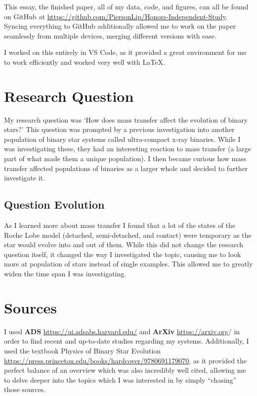 \documentclass[12pt, a4paper]{article}
\begin{document}
	This essay, the finished paper, all of my data, code, and figures, can all be found on GitHub at \url{https://github.com/PiersonLip/Honors-Independent-Study}. Syncing everything to GitHub additionally allowed me to work on the paper seamlessly from multiple devices, merging different versions with ease. 

    I worked on this entirely in VS Code, as it provided a great environment for me to work efficiently and worked very well with \LaTeX.

\section{Research Question}
    My research question was `How does mass transfer affect the evolution of binary stars?' This question was prompted by a previous investigation into another population of binary star systems called ultra-compact x-ray binaries. While I was investigating these, they had an interesting reaction to mass transfer (a large part of what made them a unique population). I then became curious how mass transfer affected populations of binaries as a larger whole and decided to further investigate it.

    \subsection{Question Evolution}    
        As I learned more about mass transfer I found that a lot of the states of the Roche Lobe model (detached, semi-detached, and contact) were temporary as the star would evolve into and out of them. While this did not change the research question itself, it changed the way I investigated the topic, causing me to look more at population of stars instead of single examples. This allowed me to greatly widen the time span I was investigating.
\section{Sources}
    I used \textbf{ADS} \url{https://ui.adsabs.harvard.edu/} and \textbf{ArXiv} \url{https://arxiv.org}/ in order to find recent and up-to-date studies regarding my systems. Additionally, I used the textbook Physics of Binary Star Evolution \url{https://press.princeton.edu/books/hardcover/9780691179070}, as it provided the perfect balance of an overview which was also incredibly well cited, allowing me to delve deeper into the topics which I was interested in by simply ``chasing'' those sources. 
\end{document}
